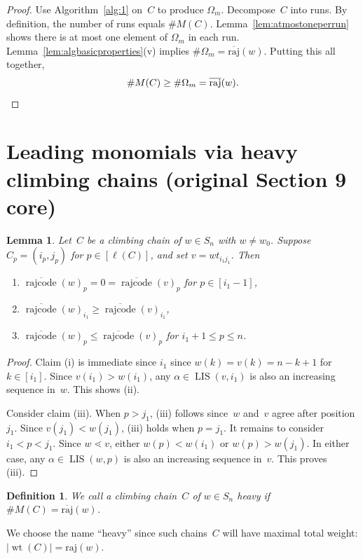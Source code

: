 \documentclass[10pt,a4paper]{amsart}
\newcommand{\absrajcode}[1]{\mathrm{raj}(#1)}
\newcommand{\absoverrajcode}[1]{\overline{\mathrm{raj}}(#1)}
\DeclareMathOperator{\LIS}{\mathrm{LIS}}
\DeclareMathOperator{\wt}{\mathrm{wt}}
\DeclareMathOperator{\rr}{\mathrm{rajcode}}
\newcommand{\orr}{\overline{\rr}}
\newtheorem{lemma}[theorem]{Lemma}
\newtheorem{definition}[theorem]{Definition}
\begin{document}
\begin{proof}
	Use Algorithm~\ref{alg:1} on~$C$ to produce $\Omega_m$. Decompose~$C$ into runs. By definition, the number of runs equals $\#M(C)$. Lemma~\ref{lem:atmostoneperrun} shows there is at most one element of $\Omega_m$ in each run. Lemma~\ref{lem:algbasicproperties}(v) implies $\#\Omega_m=\absoverrajcode{w}$. Putting this all together,
	\[\#M(C)\geq \#\Omega_m=\absoverrajcode{w}.\qedhere\]
\end{proof}

\section{Leading monomials via heavy climbing chains (original Section 9 core)}
\setcounter{section}{9}\setcounter{theorem}{0}
\begin{lemma}
	\label{lem:drecursionanychain}
	Let~$C$ be a climbing chain of $w\in S_n$ with $w\neq w_0$. Suppose $C_p=(i_p,j_p)$ for $p\in [\ell(C)]$, and set $v=wt_{i_1j_1}$. Then 
	\begin{enumerate}[label=\textup{(\roman*)}]
		\item $\orr(w)_p=0=\orr(v)_p$ for $p\in [i_1-1]$,
		\item $\orr(w)_{i_1}\geq \orr(v)_{i_1}$,
		\item $\orr(w)_p\leq \orr(v)_p$ for $i_1+1\leq p \leq n$.
	\end{enumerate}
\end{lemma}

\begin{proof}
	Claim (i) is immediate since $i_1$ since $w(k)=v(k)=n-k+1$ for $k\in[i_1]$. Since $v(i_1)>w(i_1)$, any $\alpha\in \LIS(v,i_1)$ is also an increasing sequence in~$w$. This shows (ii). 
	
	Consider claim (iii). When $p>j_1$, (iii) follows since~$w$ and~$v$ agree after position $j_1$. Since $v(j_1)<w(j_1)$, (iii) holds when $p=j_1$. It remains to consider $i_1<p<j_1$. Since $w\lessdot v$, either $w(p)<w(i_1)$ or $w(p)>w(j_1)$. In either case, any $\alpha\in \LIS(w,p)$ is also an increasing sequence in~$v$. This proves (iii).
\end{proof}

\setcounter{section}{9}\setcounter{theorem}{1}
\begin{definition}
	We call a climbing chain~$C$ of $w\in S_n$ \emph{heavy} if $\#M(C) = \absoverrajcode{w}$.
\end{definition}
We choose the name ``heavy'' since such chains~$C$ will have maximal total weight: $|\wt(C)| = \absrajcode{w}$.
\end{document}
